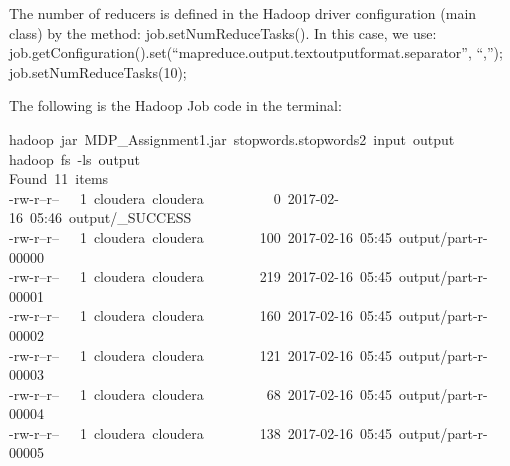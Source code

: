 \documentclass{article}
\begin{document}
\noindent The number of reducers is defined in the Hadoop driver configuration (main class) by the method:
job.setNumReduceTasks().
In this case, we use:
job.getConfiguration().set(\textquotedblleft{}mapreduce.output.textoutputformat.separator\textquotedblright{}, \textquotedblleft{},\textquotedblright{});
        job.setNumReduceTasks(10);%

The following is the Hadoop Job code in the terminal:%
\begin{mdpre}%
\noindent hadoop~jar~MDP\_Assignment1.jar~stopwords.stopwords2~input~output\\
hadoop~fs~-ls~output\\
Found~{11}~items\\
-rw-r--r--~~~{1}~cloudera~cloudera~~~~~~~~~~{0}~{2017}-{02}-{16}~{05}:{46}~output/\_SUCCESS\\
-rw-r--r--~~~{1}~cloudera~cloudera~~~~~~~~{100}~{2017}-{02}-{16}~{05}:{45}~output/part-r-{00000}\\
-rw-r--r--~~~{1}~cloudera~cloudera~~~~~~~~{219}~{2017}-{02}-{16}~{05}:{45}~output/part-r-{00001}\\
-rw-r--r--~~~{1}~cloudera~cloudera~~~~~~~~{160}~{2017}-{02}-{16}~{05}:{45}~output/part-r-{00002}\\
-rw-r--r--~~~{1}~cloudera~cloudera~~~~~~~~{121}~{2017}-{02}-{16}~{05}:{45}~output/part-r-{00003}\\
-rw-r--r--~~~{1}~cloudera~cloudera~~~~~~~~~{68}~{2017}-{02}-{16}~{05}:{45}~output/part-r-{00004}\\
-rw-r--r--~~~{1}~cloudera~cloudera~~~~~~~~{138}~{2017}-{02}-{16}~{05}:{45}~output/part-r-{00005}\\

\end{mdpre}
\end{document}
